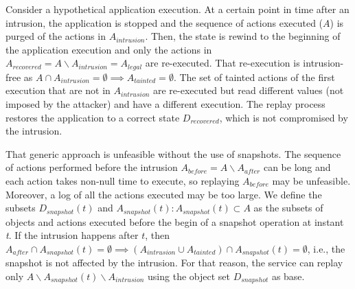 

Consider a hypothetical application execution. At a certain point in time after an intrusion, the application is stopped and the sequence of actions executed ($A$) is purged of the actions in $A_{intrusion}$.
%
Then, the state is rewind to the beginning of the application execution and only the actions in $A_{recovered} = A \backslash A_{intrusion} = A_{legal}$ are re-executed. That re-execution is intrusion-free as 
$A \cap A_{intrusion} = \emptyset \implies A_{tainted} = \emptyset$. 
The set of tainted actions of the first execution that are not in $A_{intrusion}$ are re-executed but read different values (not imposed by the attacker) and have a different execution. 
The replay process restores the application to a correct state $D_{recovered}$, which is not compromised by the intrusion.

That generic approach is unfeasible without the use of snapshots.
The sequence of actions performed before the intrusion $A_{before} = A \backslash A_{after}$ can be long and each action takes non-null time to execute, so replaying $A_{before}$ may be unfeasible. Moreover, a log of all the actions executed may be too large.
We define the subsets $D_{snapshot}(t)$ and $A_{snapshot}(t) : A_{snapshot}(t) \subset A$ as the subsets of objects and actions executed before the begin of a snapshot operation at instant \textit{t}. 
If the intrusion happens after $t$, then $A_{after} \cap A_{snapshot}(t) = \emptyset \implies (A_{intrusion} \cup A_{tainted}) \cap A_{snapshot}(t) = \emptyset$, i.e., the snapshot is not affected by the intrusion. For that reason, the service can replay only $A \backslash A_{snapshot}(t) \backslash A_{intrusion}$ using the object set $D_{snapshot}$ as base. 


